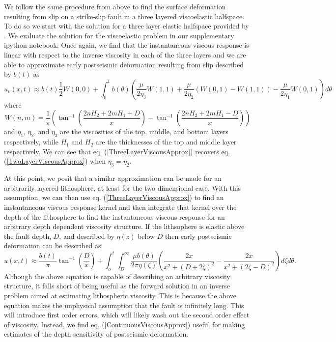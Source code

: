 \documentclass[12pt]{article}
\begin{document}
We follow the same procedure from above to find the surface
deformation resulting from slip on a strike-slip fault in a three
layered viscoelastic halfspace.  To do so we start with the solution
for a three layer elastic halfspace provided by \citet{CJ1972}.  We
evaluate the solution for the viscoelastic problem in our
supplementary ipython notebook. Once again, we find that the
instantaneous viscous response is linear with respect to the inverse
viscosity in each of the three layers and we are able to approximate
early postseismic deformation resulting from slip described by $b(t)$
as
\begin{equation}\label{ThreeLayerViscousApprox}
u_v(x,t) \approx b(t)\frac{1}{2} W(0,0) + 
         \int_0^tb(\theta)\left(\frac{\mu}{2\eta_3}W(1,1)
                               +\frac{\mu}{2\eta_2}(W(0,1) - W(1,1))
                               -\frac{\mu}{2\eta_1}W(0,1)\right)d\theta
\end{equation}
where
\begin{equation}
  W(n,m) = \frac{1}{\pi}\left(\tan^{-1}(\frac{2nH_2 + 2mH_1 + D}{x}) - 
                              \tan^{-1}(\frac{2nH_2 + 2mH_1 - D}{x})\right)
\end{equation}
and $\eta_1$, $\eta_2$, and $\eta_3$ are the viscosities of the top,
middle, and bottom layers respectively, while $H_1$ and $H_2$ are the
thicknesses of the top and middle layer respectively.  We can see that
eq. (\ref{ThreeLayerViscousApprox}) recovers eq.
(\ref{TwoLayerViscousApprox}) when $\eta_3 = \eta_2$. 

At this point, we posit that a similar approximation can be made for
an arbitrarily layered lithosphere, at least for the two dimensional
case.  With this assumption, we can then use
eq. (\ref{ThreeLayerViscousApprox}) to find an instantaneous viscous
response kernel and then integrate that kernel over the depth of the
lithosphere to find the instantaneous viscous response for an
arbitrary depth dependent viscosity structure.  If the lithsophere is
elastic above the fault depth, $D$, and described by $\eta(z)$ below
$D$ then early postseismic deformation can be described as:
\begin{equation}\label{ContinuousViscousApprox}
u(x,t) \approx \frac{b(t)}{\pi}\tan^{-1}(\frac{D}{x}) + 
               \int_o^t\int_D^\infty \frac{\mu b(\theta)}{2\pi\eta(\zeta)}
                                    \left(\frac{2x}{x^2 + \left(D + 2\zeta\right)^2} - 
                                    \frac{2x}{x^2 + \left(2\zeta - D\right)^2}\right)
                                    d\zeta d\theta.
\end{equation}
Although the above equation is capable of describing an arbitrary
viscosity structure, it falls short of being useful as the forward
solution in an inverse problem aimed at estimating lithospheric
viscosity.  This is because the above equation makes the unphysical
assumption that the fault is infinitely long.  This will introduce
first order errors, which will likely wash out the second order effect
of viscosity. Instead, we find eq. (\ref{ContinuousViscousApprox})
useful for making estimates of the depth sensitivity of
postseismic deformation.  
\end{document}
